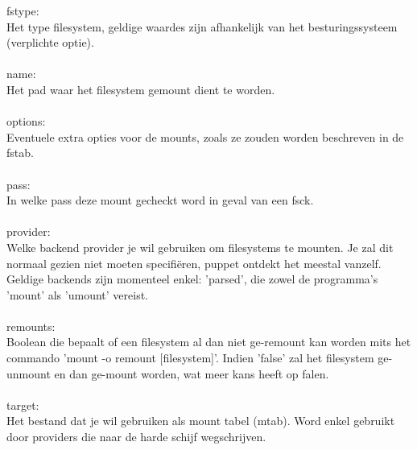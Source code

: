 %
fstype:\\
Het type filesystem, geldige waardes zijn afhankelijk van het besturingssysteem (verplichte optie).\\\\
%
name:\\
Het pad waar het filesystem gemount dient te worden.\\\\
%
options:\\
Eventuele extra opties voor de mounts, zoals ze zouden worden beschreven in de fstab.\\\\
%
pass:\\
In welke pass deze mount gecheckt word in geval van een fsck.\\\\
%
provider:\\
Welke backend provider je wil gebruiken om filesystems te mounten. Je zal dit normaal gezien niet moeten specifi\"eren, puppet ontdekt het meestal vanzelf. Geldige backends zijn momenteel enkel: 'parsed', die zowel de programma's 'mount' als 'umount' vereist.\\\\
%
remounts:\\
Boolean die bepaalt of een filesystem al dan niet ge-remount kan worden mits het commando 'mount -o remount [filesystem]'. Indien 'false' zal het filesystem ge-unmount en dan ge-mount worden, wat meer kans heeft op falen.\\\\
%
target:\\
Het bestand dat je wil gebruiken als mount tabel (mtab). Word enkel gebruikt door providers die naar de harde schijf wegschrijven.\\\\
